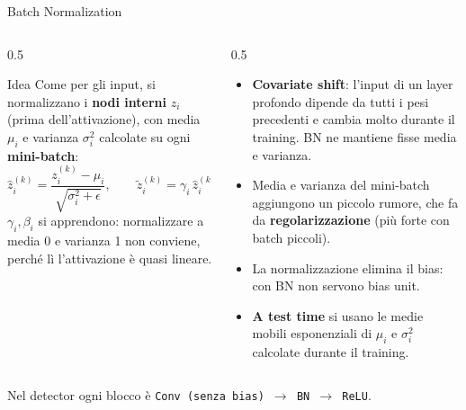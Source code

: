 \documentclass[aspectratio=169]{beamer}
\begin{document}
\begin{frame}{Batch Normalization}
  \small
  \begin{columns}[T]
    \begin{column}{0.5\textwidth}
      \begin{block}{Idea}
        Come per gli input, si normalizzano i \textbf{nodi interni} $z_i$
        (prima dell'attivazione), con media $\mu_i$ e varianza $\sigma_i^2$
        calcolate su ogni \textbf{mini-batch}:
        \[ \hat{z}_i^{(k)} = \frac{z_i^{(k)}-\mu_i}{\sqrt{\sigma_i^2+\epsilon}},
           \qquad
           \tilde{z}_i^{(k)} = \gamma_i\,\hat{z}_i^{(k)} + \beta_i \]
        $\gamma_i,\beta_i$ si apprendono: normalizzare a media 0 e varianza 1
        non conviene, perché lì l'attivazione è quasi lineare.
      \end{block}
    \end{column}
    \begin{column}{0.5\textwidth}
      \begin{itemize}
        \item \textbf{Covariate shift}: l'input di un layer profondo dipende da
              tutti i pesi precedenti e cambia molto durante il training. BN ne
              mantiene fisse media e varianza.
        \item Media e varianza del mini-batch aggiungono un piccolo rumore, che
              fa da \textbf{regolarizzazione} (più forte con batch piccoli).
        \item La normalizzazione elimina il bias: con BN non servono bias
              unit.
        \item \textbf{A test time} si usano le medie mobili esponenziali di
              $\mu_i$ e $\sigma_i^2$ calcolate durante il training.
      \end{itemize}
    \end{column}
  \end{columns}
  \vspace{0.1cm}
  \begin{center}
    Nel detector ogni blocco è \texttt{Conv (senza bias) $\to$ BN $\to$ ReLU}.
  \end{center}
\end{frame}
\end{document}
